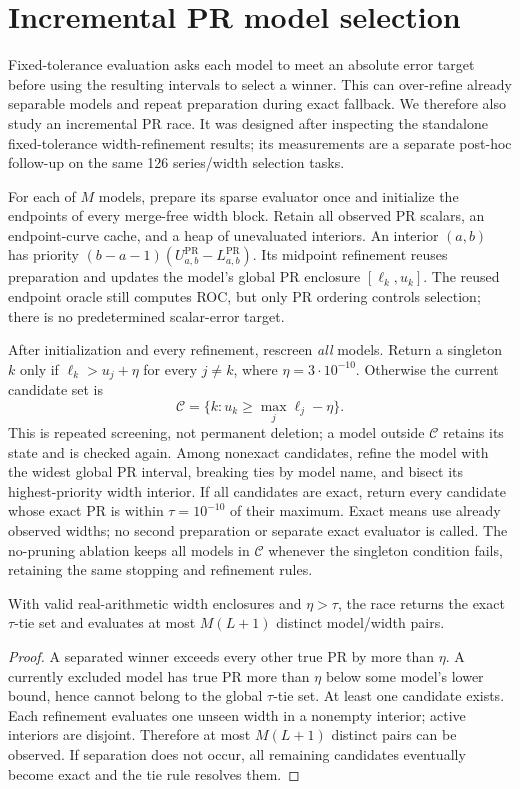 \section{Incremental PR model selection}
\label{sec:racing}
Fixed-tolerance evaluation asks each model to meet an absolute error target
before using the resulting intervals to select a winner. This can over-refine
already separable models and repeat preparation during exact fallback.
We therefore also study an incremental PR race. It was designed after
inspecting the standalone fixed-tolerance width-refinement results;
its measurements are a separate
post-hoc follow-up on the same 126 series/width selection tasks.

For each of $M$ models, prepare its sparse evaluator once and initialize
the endpoints of every merge-free width block. Retain all observed PR scalars,
an endpoint-curve cache, and a heap of unevaluated interiors. An interior
$(a,b)$ has priority $(b-a-1)(U_{a,b}^{\mathrm{PR}}-L_{a,b}^{\mathrm{PR}})$.
Its midpoint refinement reuses preparation and updates the model's global
PR enclosure $[\ell_k,u_k]$. The reused endpoint oracle still computes ROC,
but only PR ordering controls selection; there is no predetermined
scalar-error target.

After initialization and every refinement, rescreen \emph{all} models.
Return a singleton $k$ only if
$\ell_k>u_j+\eta$ for every $j\ne k$, where $\eta=3\cdot10^{-10}$.
Otherwise the current candidate set is
\[
 \mathcal C=\{k:u_k\ge\max_j\ell_j-\eta\}.
\]
This is repeated screening, not permanent deletion; a model outside
$\mathcal C$ retains its state and is checked again.
Among nonexact candidates, refine the model with the widest global PR interval,
breaking ties by model name, and bisect its highest-priority width interior.
If all candidates are exact, return every candidate whose exact PR is within
$\tau=10^{-10}$ of their maximum. Exact means use already observed widths;
no second preparation or separate exact evaluator is called.
The no-pruning ablation keeps all models in $\mathcal C$ whenever the
singleton condition fails, retaining the same stopping and refinement rules.

\begin{proposition}
With valid real-arithmetic width enclosures and $\eta>\tau$, the race returns
the exact $\tau$-tie set and evaluates at most $M(L+1)$ distinct model/width
pairs.
\end{proposition}
\begin{proof}
A separated winner exceeds every other true PR by more than $\eta$.
A currently excluded model has true PR more than $\eta$ below some model's
lower bound, hence cannot belong to the global $\tau$-tie set.
At least one candidate exists. Each refinement evaluates one unseen width
in a nonempty interior; active interiors are disjoint. Therefore at most
$M(L+1)$ distinct pairs can be observed. If separation does not occur, all
remaining candidates eventually become exact and the tie rule resolves them.
\end{proof}

